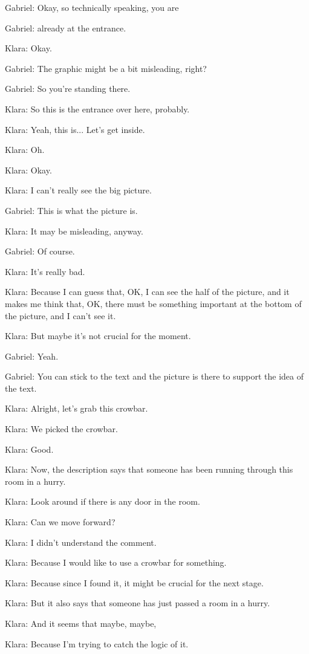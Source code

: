 Gabriel: Okay, so technically speaking, you are

Gabriel: already at the entrance.

Klara: Okay.

Gabriel: The graphic might be a bit misleading, right?

Gabriel: So you're standing there.

Klara: So this is the entrance over here, probably.

Klara: Yeah, this is... Let's get inside.

Klara: Oh.

Klara: Okay.

Klara: I can't really see the big picture.

Gabriel: This is what the picture is.

Klara: It may be misleading, anyway.

Gabriel: Of course.

Klara: It's really bad.

Klara: Because I can guess that, OK, I can see the half of the picture, and it makes me think that, OK, there must be something important at the bottom of the picture, and I can't see it.

Klara: But maybe it's not crucial for the moment.

Gabriel: Yeah.

Gabriel: You can stick to the text and the picture is there to support the idea of the text.

Klara: Alright, let's grab this crowbar.

Klara: We picked the crowbar.

Klara: Good.

Klara: Now, the description says that someone has been running through this room in a hurry.

Klara: Look around if there is any door in the room.

Klara: Can we move forward?

Klara: I didn't understand the comment.

Klara: Because I would like to use a crowbar for something.

Klara: Because since I found it, it might be crucial for the next stage.

Klara: But it also says that someone has just passed a room in a hurry.

Klara: And it seems that maybe, maybe,

Klara: Because I'm trying to catch the logic of it.

